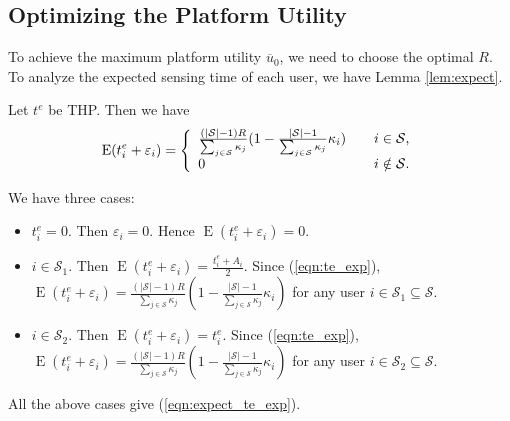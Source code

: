 \documentclass{IEEEtran}
\begin{document}
\subsection{Optimizing the Platform Utility}
To achieve the maximum platform utility $\overline{u}_0$, we need to choose the optimal $R$. To analyze the expected sensing time of each user, we have Lemma \ref{lem:expect}.
\begin{lemma}
\label{lem:expect}
Let $t^{e}$ be THP. Then we have
\begin{equation}
\label{eqn:expect_te_exp}
\operatorname{E}(t_i^{e}+\varepsilon_i)=\left\{
\begin{array}{l l}
\frac{(|\mathcal{S}|-1)R}{\sum_{j\in\mathcal{S}}\kappa_j}(1-\frac{|\mathcal{S}|-1}{\sum_{j\in\mathcal{S}}\kappa_j}\kappa_i) & \quad \text{$i\in\mathcal{S}$,}\\
0 & \quad \text{$i\notin\mathcal{S}$.}
\end{array}\right.
\end{equation}
\end{lemma}
\begin{IEEEproof}
We have three cases:
\begin{itemize}
\item $t_i^{e}=0$. Then $\varepsilon_i=0$. Hence $\operatorname{E}(t_i^{e}+\varepsilon_i)=0$.
\item $i\in\mathcal{S}_1$. Then $\operatorname{E}(t_i^{e}+\varepsilon_i)=\frac{t_i^{e}+A_i}{2}$. Since (\ref{eqn:te_exp}), $\operatorname{E}(t_i^{e}+\varepsilon_i)=\frac{(|\mathcal{S}|-1)R}{\sum_{j\in\mathcal{S}}\kappa_j}(1-\frac{|\mathcal{S}|-1}{\sum_{j\in\mathcal{S}}\kappa_j}\kappa_i)$ for any user $i\in\mathcal{S}_1\subseteq\mathcal{S}$.
\item $i\in\mathcal{S}_2$. Then $\operatorname{E}(t_i^{e}+\varepsilon_i)=t_i^{e}$. Since (\ref{eqn:te_exp}), $\operatorname{E}(t_i^{e}+\varepsilon_i)=\frac{(|\mathcal{S}|-1)R}{\sum_{j\in\mathcal{S}}\kappa_j}(1-\frac{|\mathcal{S}|-1}{\sum_{j\in\mathcal{S}}\kappa_j}\kappa_i)$ for any user $i\in\mathcal{S}_2\subseteq\mathcal{S}$.
\end{itemize}
All the above cases give (\ref{eqn:expect_te_exp}).
\end{IEEEproof}
\end{document}
